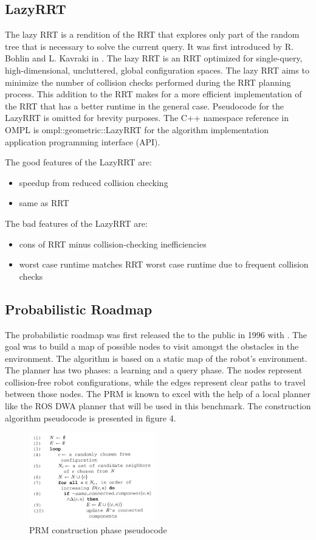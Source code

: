 \documentclass[conference]{IEEEtran} \usepackage[T1]{fontenc} \usepackage[backend=biber, style=ieee]{biblatex}
\begin{document}
\subsection{LazyRRT} \label{LazyRRT}
The lazy RRT is a rendition of the RRT that explores only part of the random tree that is necessary to solve the current query. It was first introduced by R. Bohlin and 
L. Kavraki in \cite{lazy_rrt}. The lazy RRT is an RRT optimized for single-query, high-dimensional, uncluttered, global configuration spaces. The lazy RRT aims to 
minimize the number of collision checks performed during the RRT planning process. This addition to the RRT makes for a more efficient implementation of the RRT that has 
a better runtime in the general case. Pseudocode for the LazyRRT is omitted for brevity purposes. The C++ namespace reference in OMPL is ompl::geometric::LazyRRT for
the algorithm implementation application programming interface (API).

The good features of the LazyRRT are:
\begin{itemize}
\item speedup from reduced collision checking
\item same as RRT
\end{itemize}

The bad features of the LazyRRT are:
\begin{itemize}
\item cons of RRT minus collision-checking inefficiencies
\item worst case runtime matches RRT worst case runtime due to frequent collision checks
\end{itemize}

\subsection{Probabilistic Roadmap} \label{PRM}
The probabilistic roadmap was first released the to the public in 1996 with \cite{prm}. The goal was to build a map of possible nodes to visit amongst the obstacles in 
the environment. The algorithm is based on a static map of the robot's environment. The planner has two phases: a learning and a query phase. The nodes represent 
collision-free robot configurations, while the edges represent clear paths to travel between those nodes. The PRM is known to excel with the help of a local planner like 
the ROS DWA planner that will be used in this benchmark. The construction algorithm pseudocode is presented in figure 4.

\begin{figure}
\label{figure4} 
\centering 
\includegraphics[width=0.49\textwidth]{prm}
\caption{PRM construction phase pseudocode}
\end{figure}
\end{document}
